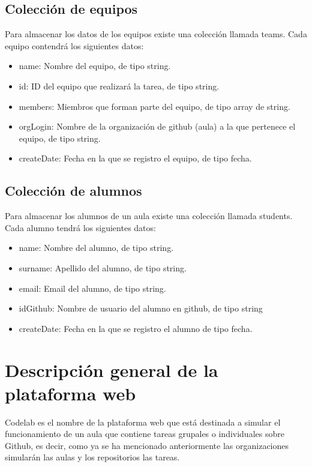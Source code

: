 \subsection{Colección de equipos}
\label{3:4:6}

Para almacenar los datos de los equipos existe una colección llamada teams. Cada equipo contendrá los siguientes datos:

\begin{itemize}
  \item name: Nombre del equipo, de tipo string.
  \item id: ID del equipo que realizará la tarea, de tipo string.
  \item members: Miembros que forman parte del equipo, de tipo array de string.
  \item orgLogin: Nombre de la organización de github (aula) a la que pertenece el equipo, de tipo string.
  \item createDate: Fecha en la que se registro el equipo, de tipo fecha.
\end{itemize}

\subsection{Colección de alumnos}
\label{3:4:7}

Para almacenar los alumnos de un aula existe una colección llamada students. Cada alumno tendrá los siguientes datos:

\begin{itemize}
  \item name: Nombre del alumno, de tipo string.
  \item surname: Apellido del alumno, de tipo string.
  \item email: Email del alumno, de tipo string.
  \item idGithub: Nombre de usuario del alumno en github, de tipo string
  \item createDate: Fecha en la que se registro el alumno de tipo fecha.
\end{itemize}

\section{Descripción general de la plataforma web}
\label{:sec5}

Codelab es el nombre de la plataforma web que está destinada a simular el funcionamiento de un aula
que contiene tareas grupales o individuales sobre Github, es decir, como ya se ha mencionado anteriormente 
las organizaciones simularán las aulas y los repositorios las tareas.

